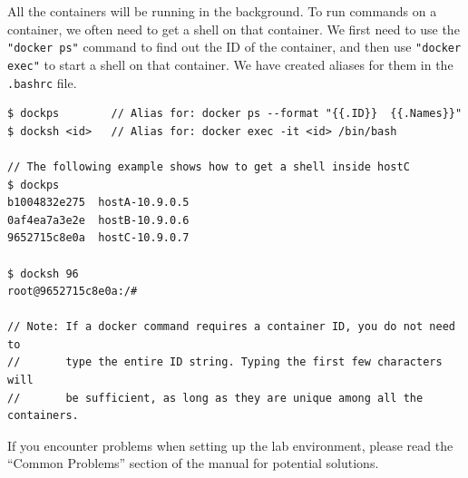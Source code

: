 All the containers will be running in the background. To run
commands on a container, we often need to get a shell on
that container. We first need to use the \texttt{"docker ps"}  
command to find out the ID of the container, and then
use \texttt{"docker exec"} to start a shell on that 
container. We have created aliases for them in
the \texttt{.bashrc} file.

\begin{lstlisting}
$ dockps        // Alias for: docker ps --format "{{.ID}}  {{.Names}}" 
$ docksh <id>   // Alias for: docker exec -it <id> /bin/bash

// The following example shows how to get a shell inside hostC
$ dockps
b1004832e275  hostA-10.9.0.5
0af4ea7a3e2e  hostB-10.9.0.6
9652715c8e0a  hostC-10.9.0.7

$ docksh 96
root@9652715c8e0a:/#  

// Note: If a docker command requires a container ID, you do not need to 
//       type the entire ID string. Typing the first few characters will 
//       be sufficient, as long as they are unique among all the containers. 
\end{lstlisting}


If you encounter problems when setting up the lab environment, 
please read the ``Common Problems'' section of the manual
for potential solutions.

